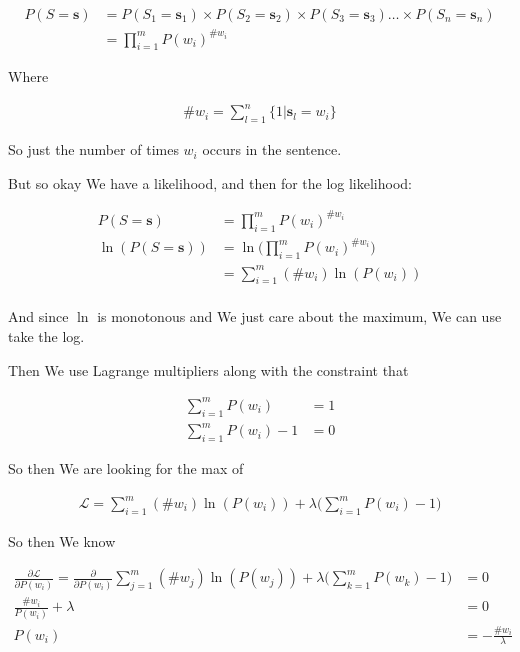 \documentclass{article}
\begin{document}
		\begin{align}
			P(S=\mathbf{s}) &= P(S_1=\mathbf{s}_1)\times P(S_2=\mathbf{s}_2)\times P(S_3=\mathbf{s}_3)\ldots \times P(S_n=\mathbf{s}_n)\\
			&= \prod^m_{i=1} P(w_i)^{\#w_i}
		\end{align}
			
		Where
		
		\begin{align}
			\# w_i = \sum^n_{l = 1} \{1|\mathbf{s}_l = w_i \}
		\end{align}
		
		So just the number of times $w_i$ occurs in the sentence.
		
		But so okay We have a likelihood, and then for the log likelihood:
		
		\begin{align}
			P(S=\mathbf{s}) &= \prod^m_{i=1} P(w_i)^{\#w_i}\\
			\ln(P(S=\mathbf{s})) &= \ln\bigg(\prod^m_{i=1} P(w_i)^{\#w_i}\bigg)\\
			&= \sum^m_{i=1} (\#w_i)\ln (P(w_i))\\
		\end{align}
		
		And since $\ln$ is monotonous and We just care about the maximum, We can use take the log.
		
		Then We use Lagrange multipliers along with the constraint that 
		
		\begin{align}
			\sum^m_{i=1} P(w_i) &= 1\\
			\sum^m_{i=1} P(w_i)-1 &= 0
		\end{align}
		
		So then We are looking for the max of 
		
		\begin{align}
			\mathcal{L}	= \sum^m_{i=1} (\#w_i)\ln (P(w_i)) + \lambda\bigg( \sum^m_{i=1} P(w_i) - 1 \bigg)
		\end{align}
		
		So then We know
		
		\begin{align}
			\frac{\partial \mathcal{L}}{\partial P(w_i)}	= \frac{\partial }{\partial P(w_i)} \sum^m_{j=1} (\#w_j)\ln (P(w_j)) + \lambda\bigg( \sum^m_{k=1} P(w_k) - 1 \bigg) &= 0\\
			\frac{\#w_i}{P(w_i)} + \lambda &= 0\\
			P(w_i)&= -\frac{\#w_i}{\lambda} 
		\end{align}
		
\end{document}

